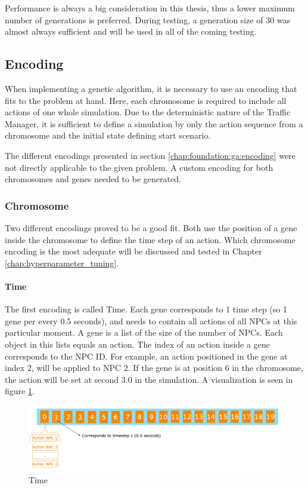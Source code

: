 Performance is always a big consideration in this thesis, thus a lower maximum number of generations is preferred. During testing, a generation size of 30 was almost always sufficient and will be used in all of the coming testing.

\subsection{Encoding}
When implementing a genetic algorithm, it is necessary to use an encoding that fits to the problem at hand. 
Here, each chromosome is required to include all actions of one whole simulation. Due to the deterministic nature of the Traffic Manager, it is sufficient to define a simulation by only the action sequence from a chromosome and the initial state defining start scenario.

The different encodings presented in section \ref{chap:foundation:ga:encoding} were not directly applicable to the given problem. A custom encoding for both chromosomes and genes needed to be generated.

\subsubsection{Chromosome}
Two different encodings proved to be a good fit. Both use the position of a gene inside the chromosome to define the time step of an action. Which chromosome encoding is the most adequate will be discussed and tested in Chapter \ref{chap:hyperparameter_tuning}.

\paragraph{Time}
The first encoding is called Time. Each gene corresponds to 1 time step (so 1 gene per every 0.5 seconds), and needs to contain all actions of all NPCs at this particular moment. A gene is a list of the size of the number of NPCs. Each object in this lists equals an action. The index of an action inside a gene corresponds to the NPC ID. For example, an action positioned in the gene at index 2, will be applied to NPC 2. If the gene is at position 6 in the chromosome, the action will be set at second 3.0 in the simulation. A visualization is seen in figure \ref{figure:encoding:chromosome:time}.

\begin{figure}[ht] 
	\includegraphics[width=1\linewidth]{figures/time_encoding}
	\caption{Time}
	\label{figure:encoding:chromosome:time}
\end{figure}


